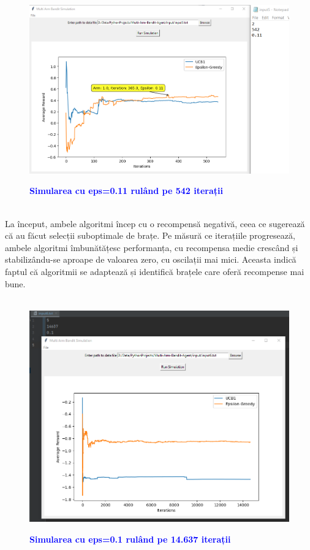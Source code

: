 \documentclass{article}
\begin{document}
\begin{figure}[h]
    \centering
    \includegraphics[width=1\linewidth]{plot generation.png}
    \bfseries\caption{\textcolor{blue}{\textbf{Simularea cu eps=0.11  rulând pe 542 iterații}}}
\end{figure}
\\La început, ambele algoritmi încep cu o recompensă negativă, ceea ce sugerează că au făcut selecții suboptimale de brațe. Pe măsură ce iterațiile progresează, ambele algoritmi îmbunătățesc performanța, cu recompensa medie crescând și stabilizându-se aproape de valoarea zero, cu oscilații mai mici. Aceasta indică faptul că algoritmii se adaptează și identifică brațele care oferă recompense mai bune.\\\\
\begin{figure}[h]
    \centering
    \includegraphics[width=1\linewidth]{plot generation 3.png}
    \bfseries\caption{\textcolor{blue}{\textbf{Simularea cu eps=0.1  rulând pe 14.637 iterații}}}
\end{figure}
\end{document}
